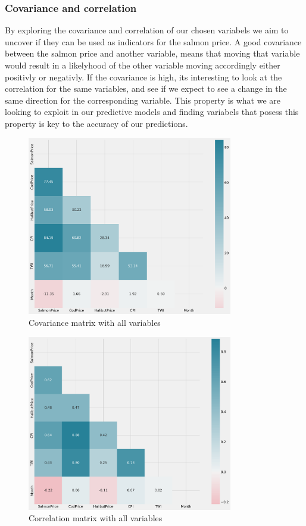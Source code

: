 \subsubsection{Covariance and correlation}\label{covariance and correlation}
By exploring the covariance and correlation of our chosen variabels we aim to uncover if they can be used as indicators for the salmon price. A good covariance between the salmon price and another variable, means that moving that variable would result in a likelyhood of the other variable moving accordingly either positivly or negativly. If the covariance is high, its interesting to look at the correlation for the same variables, and see if we expect to see a change in the same direction for the corresponding variable. This property is what we are looking to exploit in our predictive models and finding variabels that posess this property is key to the accuracy of our predictions.
\newpage
\begin{figure}[H]
    \centering
    \includegraphics[width=0.8\textwidth]{data/Figures/Descriptive/CovMatrix.png}
    \caption[Covariance matrix]{Covariance matrix with all variables}\label{fig:CovMatrix}
\end{figure}

\begin{figure}[H]
    \centering
    \includegraphics[width=0.8\textwidth]{data/Figures/Descriptive/CorrMatrix.png}
    \caption[Correlation matrix]{Correlation matrix with all variables}\label{fig:CorrMatrix}
\end{figure}

